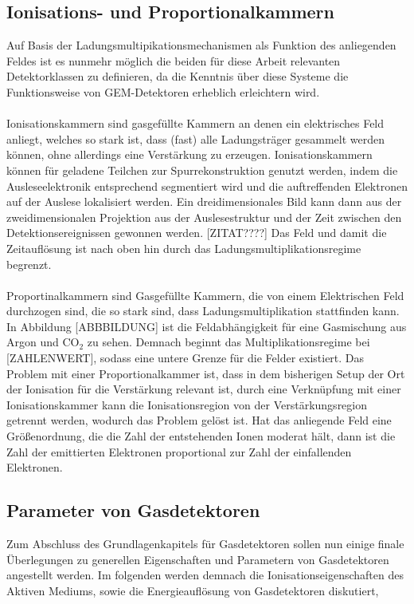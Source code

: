 		\subsection{Ionisations- und Proportionalkammern}
			Auf Basis der Ladungsmultipikationsmechanismen als Funktion des anliegenden Feldes ist es nunmehr möglich die beiden für diese Arbeit relevanten Detektorklassen zu definieren, da die Kenntnis über diese Systeme die Funktionsweise von GEM-Detektoren erheblich erleichtern wird.\\
			\\
			 Ionisationskammern sind gasgefüllte Kammern an denen ein elektrisches Feld anliegt, welches so stark ist, dass (fast) alle Ladungsträger gesammelt werden können, ohne allerdings eine Verstärkung zu erzeugen. Ionisationskammern können für geladene Teilchen zur Spurrekonstruktion genutzt werden, indem die Ausleseelektronik entsprechend segmentiert wird und die auftreffenden Elektronen auf der Auslese lokalisiert werden. Ein dreidimensionales Bild kann dann aus der zweidimensionalen Projektion aus der Auslesestruktur und der Zeit zwischen den Detektionsereignissen gewonnen werden. [ZITAT????] Das Feld und damit die Zeitauflösung ist nach oben hin durch das Ladungsmultiplikationsregime begrenzt.\\
			 \\
			 Proportinalkammern sind Gasgefüllte Kammern, die von einem Elektrischen Feld durchzogen sind, die so stark sind, dass Ladungsmultiplikation stattfinden kann. In Abbildung [ABBBILDUNG] ist die Feldabhängigkeit für eine Gasmischung aus Argon und $\text{CO}_{2}$ zu sehen. Demnach beginnt das Multiplikationsregime bei [ZAHLENWERT], sodass eine untere Grenze für die Felder existiert. Das Problem mit einer Proportionalkammer ist, dass in dem bisherigen Setup der Ort der Ionisation für die Verstärkung relevant ist, durch eine Verknüpfung mit einer Ionisationskammer kann die Ionisationsregion von der Verstärkungsregion getrennt werden, wodurch das Problem gelöst ist. Hat das anliegende Feld eine Größenordnung, die die Zahl der entstehenden Ionen moderat hält, dann ist die Zahl der emittierten Elektronen proportional zur Zahl der einfallenden Elektronen.
			 
		\subsection{Parameter von Gasdetektoren}
			Zum Abschluss des Grundlagenkapitels für Gasdetektoren sollen nun einige finale Überlegungen zu generellen Eigenschaften und Parametern von Gasdetektoren angestellt werden. Im folgenden werden demnach die Ionisationseigenschaften des Aktiven Mediums, sowie die Energieauflösung von Gasdetektoren diskutiert,
			
